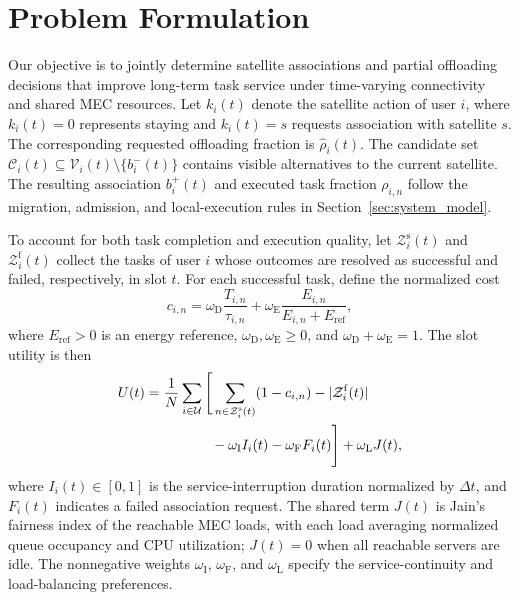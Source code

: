 \documentclass[journal]{IEEEtran}
\begin{document}
\section{Problem Formulation}
\label{sec:problem_formulation}

Our objective is to jointly determine satellite associations
and partial offloading decisions that improve long-term task
service under time-varying connectivity and shared MEC
resources. Let $k_i(t)$ denote the satellite action of user
$i$, where $k_i(t)=0$ represents staying and
$k_i(t)=s$ requests association with satellite $s$.
The corresponding requested offloading fraction is
$\widehat{\rho}_i(t)$.
The candidate set
$\mathcal{C}_i(t)\subseteq
\mathcal{V}_i(t)\setminus\{b_i^{-}(t)\}$
contains visible alternatives to the current satellite.
The resulting association $b_i^{+}(t)$ and executed task
fraction $\rho_{i,n}$ follow the migration, admission,
and local-execution rules in Section~\ref{sec:system_model}.

To account for both task completion and execution quality,
let $\mathcal{Z}_i^{\mathrm{s}}(t)$ and
$\mathcal{Z}_i^{\mathrm{f}}(t)$ collect the tasks of user $i$
whose outcomes are resolved as successful and failed,
respectively, in slot $t$.
For each successful task, define the normalized cost
\begin{equation}
c_{i,n}
=
\omega_{\mathrm D}\frac{T_{i,n}}{\tau_{i,n}}
+
\omega_{\mathrm E}
\frac{E_{i,n}}{E_{i,n}+E_{\mathrm{ref}}},
\label{eq:normalized_task_cost}
\end{equation}
where $E_{\mathrm{ref}}>0$ is an energy reference,
$\omega_{\mathrm D},\omega_{\mathrm E}\geq0$, and
$\omega_{\mathrm D}+\omega_{\mathrm E}=1$.
The slot utility is then
\begin{equation}
\begin{aligned}
U(t)
={}&\frac{1}{N}\sum_{i\in\mathcal{U}}
\Bigg[
\sum_{n\in\mathcal{Z}_i^{\mathrm{s}}(t)}
(1-c_{i,n})
-
|\mathcal{Z}_i^{\mathrm{f}}(t)|\\
&\hspace{12mm}
-\omega_{\mathrm I}I_i(t)
-\omega_{\mathrm F}F_i(t)
\Bigg]
+\omega_{\mathrm L}J(t),
\end{aligned}
\label{eq:network_service_utility}
\end{equation}
where $I_i(t)\in[0,1]$ is the service-interruption duration
normalized by $\Delta t$, and $F_i(t)$ indicates a failed
association request.
The shared term $J(t)$ is Jain's fairness index of the
reachable MEC loads, with each load averaging normalized
queue occupancy and CPU utilization; $J(t)=0$ when all
reachable servers are idle.
The nonnegative weights
$\omega_{\mathrm I}$, $\omega_{\mathrm F}$, and
$\omega_{\mathrm L}$ specify the service-continuity and
load-balancing preferences.
\end{document}
